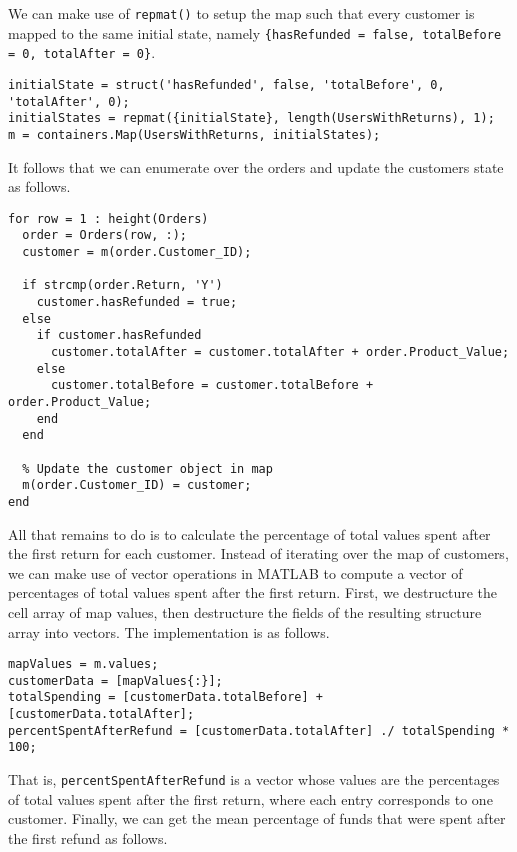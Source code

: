 \noindent
We can make use of \lstinline|repmat()| to setup the map such that every customer is mapped to the same initial state, namely \lstinline|{hasRefunded = false, totalBefore = 0, totalAfter = 0}|.

\begin{lstlisting}
initialState = struct('hasRefunded', false, 'totalBefore', 0, 'totalAfter', 0);
initialStates = repmat({initialState}, length(UsersWithReturns), 1);
m = containers.Map(UsersWithReturns, initialStates);
\end{lstlisting}

\noindent
It follows that we can enumerate over the orders and update the customers state as follows.

\begin{lstlisting}
for row = 1 : height(Orders)
  order = Orders(row, :);
  customer = m(order.Customer_ID);

  if strcmp(order.Return, 'Y')
    customer.hasRefunded = true;
  else
    if customer.hasRefunded
      customer.totalAfter = customer.totalAfter + order.Product_Value;
    else
      customer.totalBefore = customer.totalBefore + order.Product_Value;
    end
  end
  
  % Update the customer object in map
  m(order.Customer_ID) = customer;     
end
\end{lstlisting}

\noindent
All that remains to do is to calculate the percentage of total values spent after the first return for each customer. Instead of iterating over the map of customers, we can make use of vector operations in MATLAB to compute a vector of percentages of total values spent after the first return. First, we destructure the cell array of map values, then destructure the fields of the resulting structure array into vectors. The implementation is as follows.

\begin{lstlisting}
mapValues = m.values;
customerData = [mapValues{:}];
totalSpending = [customerData.totalBefore] + [customerData.totalAfter];
percentSpentAfterRefund = [customerData.totalAfter] ./ totalSpending * 100;
\end{lstlisting}

\noindent
That is, \lstinline|percentSpentAfterRefund| is a vector whose values are the percentages of total values spent after the first return, where each entry corresponds to one customer. Finally, we can get the mean percentage of funds that were spent after the first refund as follows.

